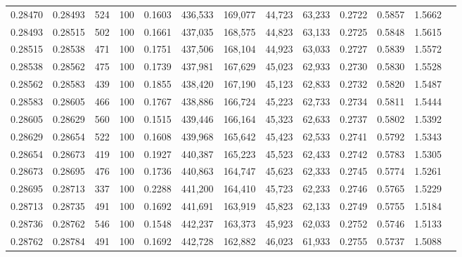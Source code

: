 \begin{tabular}{rrrrrrrrrrrrr}
0.28470 & 0.28493 &   524 & 100 &                                     0.1603 & 436,533 & 169,077 &  44,723 &  63,233 & 0.2722 & 0.5857 & 1.5662 \\
0.28493 & 0.28515 &   502 & 100 &                                     0.1661 & 437,035 & 168,575 &  44,823 &  63,133 & 0.2725 & 0.5848 & 1.5615 \\
0.28515 & 0.28538 &   471 & 100 &                                     0.1751 & 437,506 & 168,104 &  44,923 &  63,033 & 0.2727 & 0.5839 & 1.5572 \\
0.28538 & 0.28562 &   475 & 100 &                                     0.1739 & 437,981 & 167,629 &  45,023 &  62,933 & 0.2730 & 0.5830 & 1.5528 \\
0.28562 & 0.28583 &   439 & 100 &                                     0.1855 & 438,420 & 167,190 &  45,123 &  62,833 & 0.2732 & 0.5820 & 1.5487 \\
0.28583 & 0.28605 &   466 & 100 &                                     0.1767 & 438,886 & 166,724 &  45,223 &  62,733 & 0.2734 & 0.5811 & 1.5444 \\
0.28605 & 0.28629 &   560 & 100 &                                     0.1515 & 439,446 & 166,164 &  45,323 &  62,633 & 0.2737 & 0.5802 & 1.5392 \\
0.28629 & 0.28654 &   522 & 100 &                                     0.1608 & 439,968 & 165,642 &  45,423 &  62,533 & 0.2741 & 0.5792 & 1.5343 \\
0.28654 & 0.28673 &   419 & 100 &                                     0.1927 & 440,387 & 165,223 &  45,523 &  62,433 & 0.2742 & 0.5783 & 1.5305 \\
0.28673 & 0.28695 &   476 & 100 &                                     0.1736 & 440,863 & 164,747 &  45,623 &  62,333 & 0.2745 & 0.5774 & 1.5261 \\
0.28695 & 0.28713 &   337 & 100 &                                     0.2288 & 441,200 & 164,410 &  45,723 &  62,233 & 0.2746 & 0.5765 & 1.5229 \\
0.28713 & 0.28735 &   491 & 100 &                                     0.1692 & 441,691 & 163,919 &  45,823 &  62,133 & 0.2749 & 0.5755 & 1.5184 \\
0.28736 & 0.28762 &   546 & 100 &                                     0.1548 & 442,237 & 163,373 &  45,923 &  62,033 & 0.2752 & 0.5746 & 1.5133 \\
0.28762 & 0.28784 &   491 & 100 &                                     0.1692 & 442,728 & 162,882 &  46,023 &  61,933 & 0.2755 & 0.5737 & 1.5088 \\

\end{tabular}
